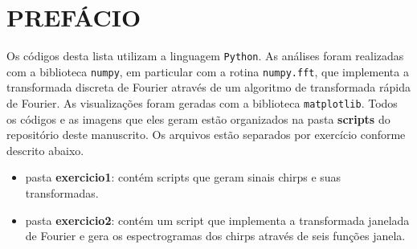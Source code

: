 
\chapter*{\large PREFÁCIO}

Os códigos desta lista utilizam a linguagem \texttt{Python}. As análises foram realizadas com a biblioteca \texttt{numpy}, em particular com a rotina \texttt{numpy.fft}, que implementa a transformada discreta de Fourier através de um algoritmo de transformada rápida de Fourier. As visualizações foram geradas com a biblioteca \texttt{matplotlib}. Todos os códigos e as imagens que eles geram estão organizados na pasta \textbf{scripts} do repositório deste manuscrito. Os arquivos estão separados por exercício conforme descrito abaixo.

\begin{itemize}

\item pasta \textbf{exercicio1}: contém scripts que geram sinais chirps e suas transformadas. 



\item pasta \textbf{exercicio2}: contém um script que implementa a transformada janelada de Fourier e gera os espectrogramas dos chirps através de seis funções janela.







\end{itemize}

